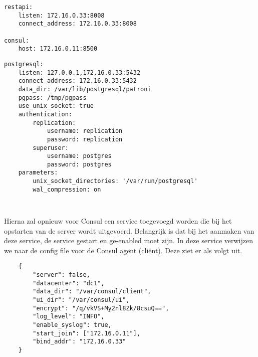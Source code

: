 \begin{lstlisting}
restapi:
    listen: 172.16.0.33:8008
    connect_address: 172.16.0.33:8008

consul:
    host: 172.16.0.11:8500
\end{lstlisting}

\begin{lstlisting}
postgresql:
    listen: 127.0.0.1,172.16.0.33:5432
    connect_address: 172.16.0.33:5432
    data_dir: /var/lib/postgresql/patroni
    pgpass: /tmp/pgpass
    use_unix_socket: true
    authentication:
        replication:
            username: replication
            password: replication
        superuser:
            username: postgres
            password: postgres
    parameters:
        unix_socket_directories: '/var/run/postgresql'
        wal_compression: on
\end{lstlisting}


\begin{lstlisting}
    
\end{lstlisting}




Hierna zal opnieuw voor Consul een service toegevoegd worden die bij het opstarten van de server wordt uitgevoerd. Belangrijk is dat bij het aanmaken van deze service, de service gestart en ge-enabled moet zijn. In deze service verwijzen we naar de config file voor de Consul agent (cliënt). Deze ziet er als volgt uit.

\begin{lstlisting}
    {
        "server": false,
        "datacenter": "dc1",
        "data_dir": "/var/consul/client",
        "ui_dir": "/var/consul/ui",
        "encrypt": "/q/vkVS+My2nl8Zk/8csuQ==", 
        "log_level": "INFO",
        "enable_syslog": true,
        "start_join": ["172.16.0.11"],
        "bind_addr": "172.16.0.33"
    }
\end{lstlisting}






\section{}
\label{sec:Persoonlijke conclusie}


